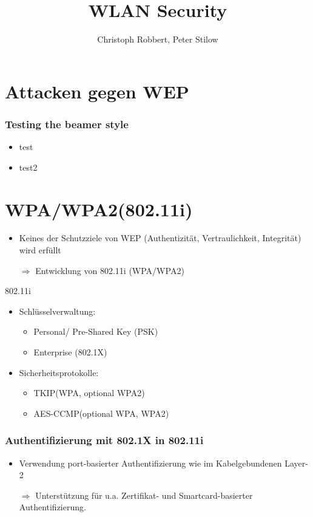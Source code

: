 \documentclass{beamer}
\author[C.Robbert, P. Stilow]{Christoph Robbert, Peter Stilow}
\institute[Uni Paderborn]{Universität Paderborn}
\title[WLAN Security]{WLAN Security}
\begin{document}
\begin{frame}
\maketitle
\end{frame}
\section{Attacken gegen WEP}
\begin{frame}
\frametitle{Testing the beamer style}
\begin{itemize}
	\item test
	\item test2
\end{itemize}

\end{frame}


\section{WPA/WPA2(802.11i)}
\begin{frame}
\begin{itemize}
	\item Keines der Schutzziele von WEP (Authentizität, Vertraulichkeit, Integrität) wird erfüllt
	\item[$\Rightarrow$] Entwicklung von 802.11i (WPA/WPA2)
\end{itemize}
\begin{block}{802.11i}
\begin{itemize}
	\item Schlüsselverwaltung:
	\begin{itemize}
		\item Personal/ Pre-Shared Key (PSK)
		\item Enterprise (802.1X)
	\end{itemize}
	\item Sicherheitsprotokolle:
	\begin{itemize}
		\item TKIP(WPA, optional WPA2)
		\item AES-CCMP(optional WPA, WPA2)
	\end{itemize}
\end{itemize}
\end{block}
\end{frame}

\begin{frame}
	\frametitle{Authentifizierung mit 802.1X in 802.11i}
	\begin{itemize}
		\item Verwendung port-basierter Authentifizierung wie im Kabelgebundenen Layer-2
		\item[$\Rightarrow$] Unterstützung für u.a. Zertifikat- und Smartcard-basierter Authentifizierung.
	\end{itemize}
\end{frame}
\end{document}
